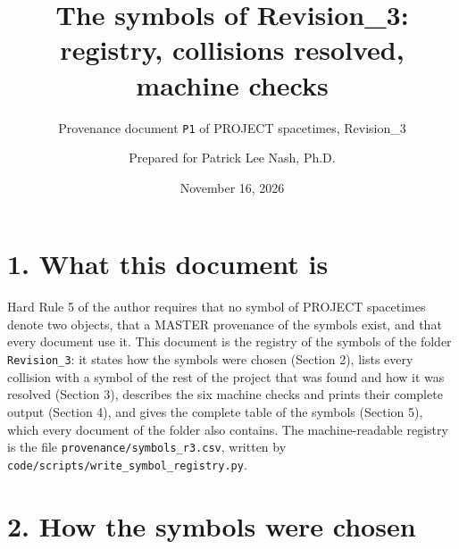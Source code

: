 \documentclass[
  10pt,
]{article}
\title{The symbols of Revision\_3: registry, collisions resolved,
machine checks}
\subtitle{Provenance document \texttt{P1} of PROJECT spacetimes,
Revision\_3}
\author{Prepared for Patrick Lee Nash, Ph.D.}
\date{November 16, 2026}
\begin{document}
\maketitle

\hypertarget{what-this-document-is}{%
\section{1. What this document is}\label{what-this-document-is}}

Hard Rule 5 of the author requires that no symbol of PROJECT spacetimes
denote two objects, that a MASTER provenance of the symbols exist, and
that every document use it. This document is the registry of the symbols
of the folder \texttt{Revision\_3}: it states how the symbols were
chosen (Section 2), lists every collision with a symbol of the rest of
the project that was found and how it was resolved (Section 3),
describes the six machine checks and prints their complete output
(Section 4), and gives the complete table of the symbols (Section 5),
which every document of the folder also contains. The machine-readable
registry is the file \texttt{provenance/symbols\_r3.csv}, written by
\texttt{code/scripts/write\_symbol\_registry.py}.

\hypertarget{how-the-symbols-were-chosen}{%
\section{2. How the symbols were
chosen}\label{how-the-symbols-were-chosen}}
\end{document}
